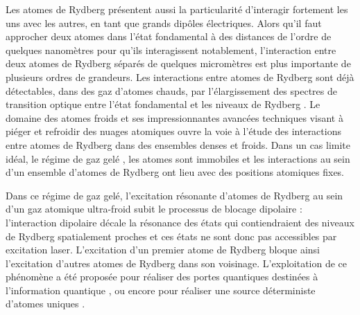 Les atomes de Rydberg présentent aussi la particularité d'interagir fortement les uns avec les autres, en tant que grands dipôles électriques.
Alors qu'il faut approcher deux atomes dans l'état fondamental à des distances de l'ordre de quelques nanomètres pour qu'ils interagissent notablement, l'interaction entre deux atomes de Rydberg séparés de quelques micromètres est plus importante de plusieurs ordres de grandeurs.
Les interactions entre atomes de Rydberg sont déjà détectables, dans des gaz d'atomes chauds, par l'élargissement des spectres de transition optique entre l'état fondamental et les niveaux de Rydberg \cite{ENS_DENSEGAS,ENS_LASERSPEC5SP}.
Le domaine des atomes froids et ses impressionnantes avancées techniques visant à piéger et refroidir des nuages atomiques \cite{Pritchard1983,Dalibard1983,Dalibard1984,Chu1986,CCT1990} ouvre la voie à l'étude des interactions entre atomes de Rydberg dans des ensembles denses et froids.
Dans un cas limite idéal, le régime de \og gaz gelé \fg{} \cite{Gallagher1998,Pillet1998}, les atomes sont immobiles et les interactions au sein d'un ensemble d'atomes de Rydberg ont lieu avec des positions atomiques fixes.


Dans ce régime de gaz gelé, l'excitation résonante d'atomes de Rydberg au sein d'un gaz atomique ultra-froid subit le processus de \og blocage dipolaire \fg{} \cite{Lukin2001} :
l'interaction dipolaire décale la résonance des états qui contiendraient des niveaux de Rydberg spatialement proches et ces états ne sont donc pas accessibles par excitation laser.
L'excitation d'un premier atome de Rydberg bloque ainsi l'excitation d'autres atomes de Rydberg dans son voisinage.
L'exploitation de ce phénomène a été proposée pour réaliser des portes quantiques destinées à l'information quantique \cite{Lukin2001,Lukin2000b,Saffman2010}, ou encore pour réaliser une source déterministe d'atomes uniques \cite{Saffman2002}.

